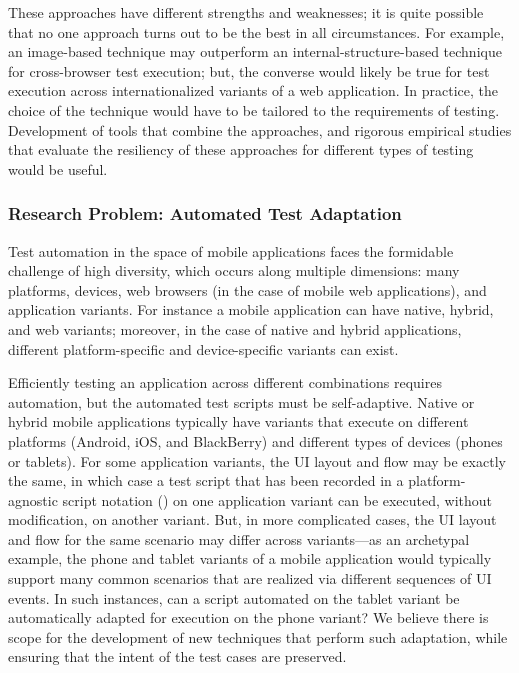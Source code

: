 These approaches have different strengths and weaknesses; it is quite possible
that no one approach turns out to be the best in all circumstances. For example,
an image-based technique may outperform an internal-structure-based technique
for cross-browser test execution; but, the converse would likely be true for
test execution across internationalized variants of a web application. In
practice, the choice of the technique would have to be tailored to the
requirements of testing.  Development of tools that combine the approaches, and
rigorous empirical studies that evaluate the resiliency of these approaches for
different types of testing would be useful.


\subsubsection*{Research Problem: Automated Test Adaptation}

Test automation in the space of mobile applications faces the form\-idable
challenge of high diversity, which occurs along multiple dimensions: many
platforms, devices, web browsers (in the case of mobile web applications), and
application variants. For instance a mobile application can have native, hybrid,
and web variants; moreover, in the case of native and hybrid applications,
different platform-specific and device-specific variants can exist.

Efficiently testing an application across different combinations requires
automation, but the automated test scripts must be self-adaptive. Native or
hybrid mobile applications typically have variants that execute on different
platforms (\eg Android, iOS, and BlackBerry) and different types of devices
(phones or tablets). For some application variants, the UI layout and flow may
be exactly the same, in which case a test script that has been recorded in a
platform-agnostic script notation (\eg \cite{PerfectoScriptOnce}) on one
application variant can be executed, without modification, on another
variant. But, in more complicated cases, the UI layout and flow for the same
scenario may differ across variants---as an archetypal example, the phone and
tablet variants of a mobile application would typically support many common
scenarios that are realized via different sequences of UI events. In such
instances, can a script automated on the tablet variant be automatically adapted
for execution on the phone variant? We believe there is scope for the
development of new techniques that perform such adaptation, while ensuring that
the intent of the test cases are preserved.

